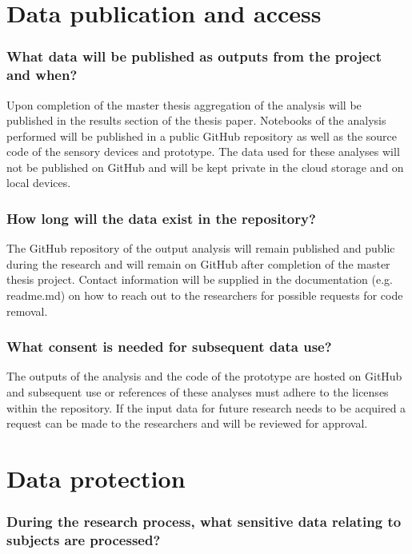 \documentclass[a4paper]{article}
\begin{document}
\section{Data publication and access}

\subsubsection{What data will be published as outputs from the project and when?}

Upon completion of the master thesis aggregation of the analysis will be published in the results section of the thesis paper. Notebooks of the analysis performed will be published in a public GitHub repository as well as the source code of the sensory devices and prototype. The data used for these analyses will not be published on GitHub and will be kept private in the cloud storage and on local devices.

\subsubsection{How long will the data exist in the repository?}

The GitHub repository of the output analysis will remain published and public during the research and will remain on GitHub after completion of the master thesis project. Contact information will be supplied in the documentation (e.g. readme.md) on how to reach out to the researchers for possible requests for code removal.

\subsubsection{What consent is needed for subsequent data use?}

The outputs of the analysis and the code of the prototype are hosted on GitHub and subsequent use or references of these analyses must adhere to the licenses within the repository. If the input data for future research needs to be acquired a request can be made to the researchers and will be reviewed for approval.

\section{Data protection}

\subsubsection{During the research process, what sensitive data relating to subjects are processed?}
\end{document}
